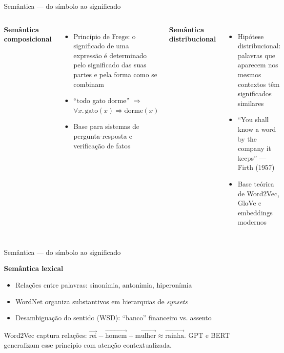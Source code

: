 \documentclass[xcolor=dvipsnames,t,aspectratio=169]{beamer}
\newcommand{\highlight}[1]{{\color{nes_dark_orange} #1}}
\begin{document}
\begin{frame}[c]{Semântica — do símbolo ao significado}

\begin{columns}
\textbf{\color{nes_dark_purple}Semântica composicional}
\begin{itemize}
    \item Princípio de Frege: o significado de uma expressão é determinado pelo significado das suas partes e pela forma como se combinam
    \item ``todo gato dorme'' $\Rightarrow$ $\forall x.\,\text{gato}(x) \Rightarrow \text{dorme}(x)$
    \item Base para sistemas de \highlight{pergunta-resposta} e verificação de fatos
\end{itemize}



\textbf{\color{nes_dark_purple}Semântica distribucional}
\begin{itemize}
    \item Hipótese distribucional: palavras que aparecem nos mesmos contextos têm significados similares
    \item ``You shall know a word by the company it keeps'' — Firth (1957)
    \item Base teórica de \highlight{Word2Vec, GloVe e embeddings modernos}
\end{itemize}


\end{columns}

\end{frame}

\begin{frame}[c]{Semântica — do símbolo ao significado}


\textbf{\color{nes_dark_purple}Semântica lexical}
\begin{itemize}
    \item Relações entre palavras: sinonímia, antonímia, hiperonímia
    \item \highlight{WordNet} organiza substantivos em hierarquias de \emph{synsets}
    \item Desambiguação do sentido (WSD): ``banco'' financeiro vs. assento
\end{itemize}


\begin{display}
Word2Vec captura relações: $\vec{\text{rei}} - \vec{\text{homem}} + \vec{\text{mulher}} \approx \vec{\text{rainha}}$. GPT e BERT generalizam esse princípio com atenção contextualizada.
\end{display}

\end{frame}
\end{document}

